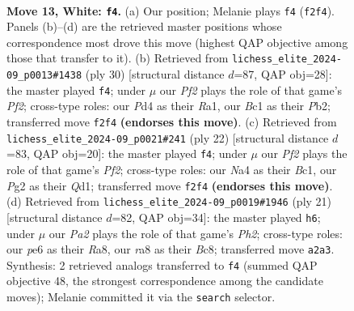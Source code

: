 \documentclass[11pt]{article}
\begin{document}
\begin{figure}[p]
\label{fig:thought-m22}
\end{figure}

\clearpage

\begin{figure}[p]\centering
\begin{subfigure}{0.46\textwidth}\centering
\resizebox{\linewidth}{!}{%
\newchessgame
\chessboard[
  setfen={r1bq3r/p2nkppp/2pbpn2/8/Np1P3N/3BP3/PP3PPP/R1BQ1RK1 w - - 6 13},
  showmover=false,
  pgfstyle=straightmove, color=movearrow, markmove={f2-f4}
]}
\caption{}
\end{subfigure}\hfill
\begin{subfigure}{0.46\textwidth}\centering
\resizebox{\linewidth}{!}{%
\newchessgame
\chessboard[
  setfen={r2qk2r/pp2nbp1/2nbpp2/3p3p/3P3N/2P1B2P/PP1NBPP1/R2Q1RK1 w kq - 6 16},
  showmover=false,
  pgfstyle=straightmove, color=movearrow, markmove={f2-f4}
]}
\caption{}
\end{subfigure}
\\[4pt]
\begin{subfigure}{0.46\textwidth}\centering
\resizebox{\linewidth}{!}{%
\newchessgame
\chessboard[
  setfen={r2qkb1r/pp1n1ppp/1np1p3/5b2/2PP4/2N5/PP2BPPP/R1BQ1RK1 w kq - 2 12},
  showmover=false,
  pgfstyle=straightmove, color=movearrow, markmove={f2-f4}
]}
\caption{}
\end{subfigure}\hfill
\begin{subfigure}{0.46\textwidth}\centering
\resizebox{\linewidth}{!}{%
\newchessgame
\chessboard[
  setfen={r1bq1rk1/1pp2pbp/2n3p1/3np3/p7/P1PP1NP1/1P1N1PBP/R1BQR1K1 b - - 0 11},
  showmover=false,
  pgfstyle=straightmove, color=movearrow, markmove={h7-h6}
]}
\caption{}
\end{subfigure}
\caption{\textbf{Move 13, White: \texttt{f4}.} (a) Our position; Melanie plays \texttt{f4} (\texttt{f2f4}). Panels (b)--(d) are the retrieved master positions whose correspondence most drove this move (highest QAP objective among those that transfer to it). (b) Retrieved from \texttt{lichess\_elite\_2024-09\_p0013\#1438} (ply 30) [structural distance $d$=87, QAP obj=28]: the master played \texttt{f4}; under $\mu$ our \emph{Pf2} plays the role of that game's \emph{Pf2}; cross-type roles: our \emph{P}d4 as their \emph{R}a1, our \emph{B}c1 as their \emph{P}b2; transferred move \texttt{f2f4} \textbf{(endorses this move)}. (c) Retrieved from \texttt{lichess\_elite\_2024-09\_p0021\#241} (ply 22) [structural distance $d$=83, QAP obj=20]: the master played \texttt{f4}; under $\mu$ our \emph{Pf2} plays the role of that game's \emph{Pf2}; cross-type roles: our \emph{N}a4 as their \emph{B}c1, our \emph{P}g2 as their \emph{Q}d1; transferred move \texttt{f2f4} \textbf{(endorses this move)}. (d) Retrieved from \texttt{lichess\_elite\_2024-09\_p0019\#1946} (ply 21) [structural distance $d$=82, QAP obj=34]: the master played \texttt{h6}; under $\mu$ our \emph{Pa2} plays the role of that game's \emph{Ph2}; cross-type roles: our \emph{p}e6 as their \emph{R}a8, our \emph{r}a8 as their \emph{B}c8; transferred move \texttt{a2a3}. Synthesis: 2 retrieved analogs transferred to \texttt{f4} (summed QAP objective 48, the strongest correspondence among the candidate moves); Melanie committed it via the \texttt{search} selector.}

\end{figure}
\end{document}
